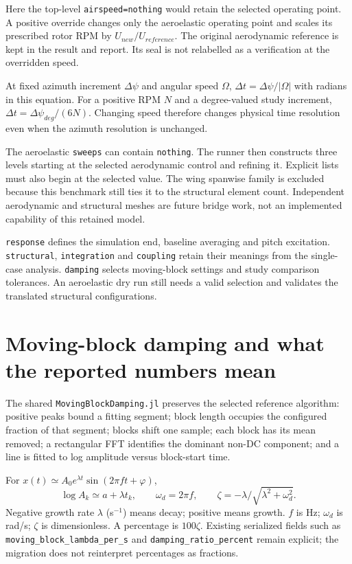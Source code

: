 \documentclass[11pt,a4paper]{article}
\newcommand{\code}{\nolinkurl}
\begin{document}
Here the top-level \code{airspeed=nothing} would retain the selected operating
point. A positive override changes only the aeroelastic operating point and
scales its prescribed rotor RPM by $U_{new}/U_{reference}$. The original
aerodynamic reference is kept in the result and report. Its seal is not
relabelled as a verification at the overridden speed.

At fixed azimuth increment $\Delta\psi$ and angular speed $\Omega$,
$\Delta t=\Delta\psi/|\Omega|$ with radians in this equation. For a positive
RPM $N$ and a degree-valued study increment, $\Delta t=\Delta\psi_{deg}/(6N)$.
Changing speed therefore changes physical time resolution even when the
azimuth resolution is unchanged.

The aeroelastic \code{sweeps} can contain \code{nothing}. The runner then
constructs three levels starting at the selected aerodynamic control and
refining it. Explicit lists must also begin at the selected value. The wing
spanwise family is excluded because this benchmark still ties it to the
structural element count. Independent aerodynamic and structural meshes are
future bridge work, not an implemented capability of this retained model.

\code{response} defines the simulation end, baseline averaging and pitch
excitation. \code{structural}, \code{integration} and \code{coupling} retain
their meanings from the single-case analysis. \code{damping} selects moving-block
settings and study comparison tolerances. An aeroelastic dry run still needs a
valid selection and validates the translated structural configurations.

\section{Moving-block damping and what the reported numbers mean}

The shared \code{MovingBlockDamping.jl} preserves the selected reference
algorithm: positive peaks bound a fitting segment; block length occupies the
configured fraction of that segment; blocks shift one sample; each block has
its mean removed; a rectangular FFT identifies the dominant non-DC component;
and a line is fitted to log amplitude versus block-start time.

For $x(t)\simeq A_0e^{\lambda t}\sin(2\pi f t+\varphi)$,
\begin{equation}
 \log A_k\simeq a+\lambda t_k,\qquad
 \omega_d=2\pi f,\qquad
 \zeta=-\lambda/\sqrt{\lambda^2+\omega_d^2}.
\end{equation}
Negative growth rate $\lambda$ (s$^{-1}$) means decay; positive means growth.
$f$ is Hz; $\omega_d$ is rad/s; $\zeta$ is dimensionless. A percentage is
$100\zeta$. Existing serialized fields such as
\code{moving_block_lambda_per_s} and \code{damping_ratio_percent} remain
explicit; the migration does not reinterpret percentages as fractions.
\end{document}
